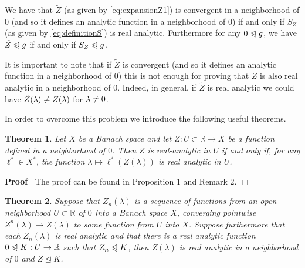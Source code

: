 \documentclass{article}
\newenvironment{proof}{\noindent\textbf{Proof\ }}{\hspace*{\fill}$\Box$\medskip}
\newtheorem{theorem}{Theorem}
\begin{document}
\begin{remark}
  We have that $\tilde{Z}$ (as given by {\eqref{eq:expansionZ1}}) is
  convergent in a neighborhood of $0$ (and so it defines an analytic function
  in a neighborhood of $0$) if and only if $S_Z$ (as given by
  {\eqref{eq:definitionS}}) is real analytic. Furthermore for any $0
  \trianglelefteqslant g$, we have $\tilde{Z} \trianglelefteqslant g$ if and
  only if $S_Z \trianglelefteqslant g$.
\end{remark}

It is important to note that if $\tilde{Z}$ is convergent (and so it defines
an analytic function in a neighborhood of $0$) this is not enough for proving
that $Z$ is also real analytic in a neighborhood of $0$. Indeed, in general,
if $\tilde{Z}$ is real analytic we could have $\tilde{Z} (\lambda) \centernot{=} Z
(\lambda)$ for $\lambda \centernot{=} 0$.

In order to overcome this problem we introduce the following useful theorems.

\begin{theorem}
  \label{theorem:propertiesanalytic}Let $X$ be a Banach space and let $Z : U
  \subset \mathbb{R} \rightarrow X$ be a function defined in a neighborhood of
  $0$. Then $Z$ is real-analytic in $U$ if and only if, for any $\ell^{\ast}
  \in X^{\ast}$, the function $\lambda \mapsto \ell^{\ast} (Z (\lambda))$ is
  real analytic in $U$.
\end{theorem}

\begin{proof}
  The proof can be found in {\cite{Browder1962}} Proposition 1 and Remark 2.
\end{proof}

\begin{theorem}
  \label{theorem:convergencerealanalytic}Suppose that $Z_n (\lambda)$ is a
  sequence of functions from an open neighborhood $U \subset \mathbb{R}$ of
  $0$ into a Banach space $X$, converging pointwise $Z^n (\lambda) \rightarrow
  Z (\lambda)$ to some function from $U$ into $X$. Suppose furthermore that
  each $Z_n (\lambda)$ is real analytic and that there is a real analytic
  function $0 \trianglelefteqslant K : U \rightarrow \mathbb{R}$ such that
  $Z_n \trianglelefteqslant K$, then $Z (\lambda)$ is real analytic in a
  neighborhood of $0$ and $Z \trianglelefteq K$.
\end{theorem}
\end{document}
